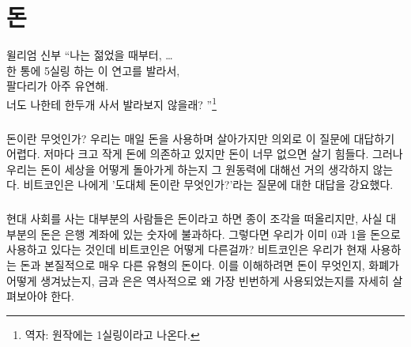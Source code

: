 \chapter{돈}
\label{les:11}

\begin{chapquote}{윌리엄 신부}
	\enquote{나는 젊었을 때부터, \ldots \\
		한 통에 5실링 하는 이 연고를 발라서, \\
		팔다리가 아주 유연해. \\
		너도 나한테 한두개 사서 발라보지 않을래?
	}\footnote{역자: 원작에는 1실링이라고 나온다.}
\end{chapquote}



\paragraph{}
돈이란 무엇인가? 
우리는 매일 돈을 사용하며 살아가지만 의외로 이 질문에 대답하기 어렵다. 
저마다 크고 작게 돈에 의존하고 있지만 돈이 너무 없으면 살기 힘들다.
그러나 우리는 돈이 세상을 어떻게 돌아가게 하는지 그 원동력에 대해선 거의 생각하지 않는다.
비트코인은 나에게 '도대체 돈이란 무엇인가?'라는 질문에 대한 대답을 강요했다.



\paragraph{}
현대 사회를 사는 대부분의 사람들은 돈이라고 하면 종이 조각을 떠올리지만, 사실 대부분의 돈은 은행 계좌에 있는 숫자에 불과하다.
그렇다면 우리가 이미 0과 1을 돈으로 사용하고 있다는 것인데 비트코인은 어떻게 다른걸까? 
비트코인은 우리가 현재 사용하는 돈과 본질적으로 매우 다른 유형의 돈이다. 
이를 이해하려면 돈이 무엇인지, 화폐가 어떻게 생겨났는지, 
금과 은은 역사적으로 왜 가장 빈번하게 사용되었는지를 자세히 살펴보아야 한다.


